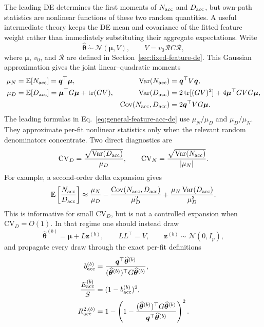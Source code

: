 \documentclass[11pt]{article}
\newcommand{\E}{\mathbb{E}}
\newcommand{\tr}{\operatorname{tr}}
\newcommand{\Var}{\operatorname{Var}}
\newcommand{\Cov}{\operatorname{Cov}}
\newcommand{\that}{\widehat{\bm\theta}}
\begin{document}
The leading DE determines the first moments of $N_{\rm acc}$ and
$D_{\rm acc}$, but own-path statistics are nonlinear functions of these two
random quantities.  A useful intermediate theory keeps the DE mean and
covariance of the fitted feature weight rather than immediately substituting
their aggregate expectations.  Write
\begin{equation}
  \that\ \dot\sim\ \mathcal N(\bm\mu,V),
  \qquad
  V=v_0\mathcal R C\mathcal R,
  \label{eq:gaussian-weight-de}
\end{equation}
where $\bm\mu$, $v_0$, and $\mathcal R$ are defined in
Section~\ref{sec:fixed-feature-de}.  This Gaussian approximation gives the
joint linear--quadratic moments
\begin{align}
  \mu_N&=\E[N_{\rm acc}]=\bm q^{\top}\bm\mu,
  &\Var(N_{\rm acc})&=\bm q^{\top}V\bm q,\\
  \mu_D&=\E[D_{\rm acc}]
       =\bm\mu^{\top}G\bm\mu+\tr(GV),
  &\Var(D_{\rm acc})
       &=2\tr[(GV)^2]+4\bm\mu^{\top}GVG\bm\mu,\\
  &&\Cov(N_{\rm acc},D_{\rm acc})
       &=2\bm q^{\top}VG\bm\mu.
  \label{eq:gaussian-nd-moments}
\end{align}
The leading formulas in Eq.~\eqref{eq:general-feature-acc-de} use
$\mu_N/\mu_D$ and $\mu_D/\mu_N$.  They approximate per-fit nonlinear
statistics only when the relevant random denominators concentrate.  Two
direct diagnostics are
\begin{equation}
  \mathrm{CV}_D
  =\frac{\sqrt{\Var(D_{\rm acc})}}{\mu_D},
  \qquad
  \mathrm{CV}_N
  =\frac{\sqrt{\Var(N_{\rm acc})}}{|\mu_N|}.
  \label{eq:nd-concentration-diagnostics}
\end{equation}
For example, a second-order delta expansion gives
\begin{equation}
  \E\left[\frac{N_{\rm acc}}{D_{\rm acc}}\right]
  \approx
  \frac{\mu_N}{\mu_D}
  -\frac{\Cov(N_{\rm acc},D_{\rm acc})}{\mu_D^2}
  +\frac{\mu_N\Var(D_{\rm acc})}{\mu_D^3}.
  \label{eq:delta-slope-acc}
\end{equation}
This is informative for small $\mathrm{CV}_D$, but is not a controlled
expansion when $\mathrm{CV}_D=O(1)$.  In that regime one should instead draw
\begin{equation}
  \that^{(b)}=\bm\mu+L\bm z^{(b)},
  \qquad LL^{\top}=V,
  \qquad \bm z^{(b)}\sim\mathcal N(0,I_p),
  \label{eq:gaussian-de-sampling}
\end{equation}
and propagate every draw through the exact per-fit definitions
\begin{align}
  b_{\rm acc}^{(b)}
    &=\frac{\bm q^{\top}\that^{(b)}}
            {(\that^{(b)})^{\top}G\that^{(b)}},\\
  \frac{E_{\rm acc}^{(b)}}{S}
    &=(1-b_{\rm acc}^{(b)})^2,\\
  R_{\rm acc}^{2,(b)}
    &=1-\left(
      1-\frac{(\that^{(b)})^{\top}G\that^{(b)}}
               {\bm q^{\top}\that^{(b)}}\right)^2.
  \label{eq:gaussian-de-control-metrics}
\end{align}
\end{document}

